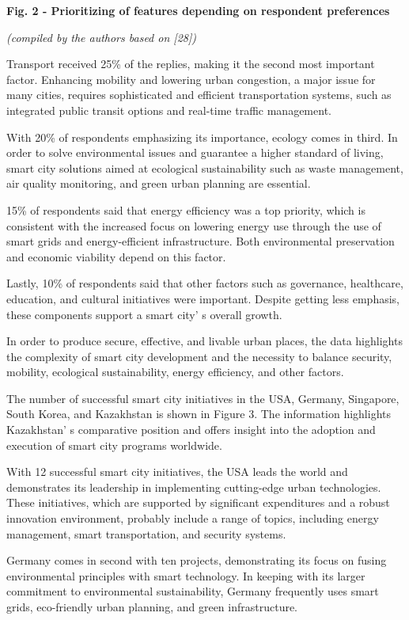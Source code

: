 {\bfseries Fig. 2 - Prioritizing of features depending on respondent
preferences}

\emph{(compiled by the authors based on {[}28{]})}

Transport received 25\% of the replies, making it the second most
important factor. Enhancing mobility and lowering urban congestion, a
major issue for many cities, requires sophisticated and efficient
transportation systems, such as integrated public transit options and
real-time traffic management.

With 20\% of respondents emphasizing its importance, ecology comes in
third. In order to solve environmental issues and guarantee a higher
standard of living, smart city solutions aimed at ecological
sustainability such as waste management, air quality monitoring, and
green urban planning are essential.

15\% of respondents said that energy efficiency was a top priority,
which is consistent with the increased focus on lowering energy use
through the use of smart grids and energy-efficient infrastructure. Both
environmental preservation and economic viability depend on this factor.

Lastly, 10\% of respondents said that other factors such as governance,
healthcare, education, and cultural initiatives were important. Despite
getting less emphasis, these components support a smart
city' s overall growth.

In order to produce secure, effective, and livable urban places, the
data highlights the complexity of smart city development and the
necessity to balance security, mobility, ecological sustainability,
energy efficiency, and other factors.

The number of successful smart city initiatives in the USA, Germany,
Singapore, South Korea, and Kazakhstan is shown in Figure 3. The
information highlights Kazakhstan' s comparative position
and offers insight into the adoption and execution of smart city
programs worldwide.

With 12 successful smart city initiatives, the USA leads the world and
demonstrates its leadership in implementing cutting-edge urban
technologies. These initiatives, which are supported by significant
expenditures and a robust innovation environment, probably include a
range of topics, including energy management, smart transportation, and
security systems.

Germany comes in second with ten projects, demonstrating its focus on
fusing environmental principles with smart technology. In keeping with
its larger commitment to environmental sustainability, Germany
frequently uses smart grids, eco-friendly urban planning, and green
infrastructure.

